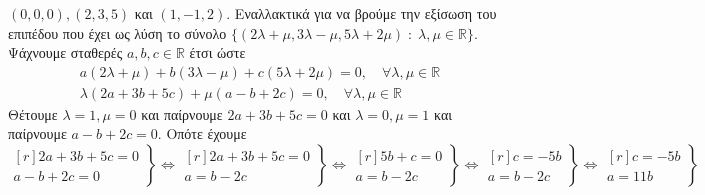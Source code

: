 \begin{examples}
\begin{enumerate}
            $ (0,0,0), (2,3,5) $ και $ (1,-1,2) $. Εναλλακτικά για να βρούμε την 
            εξίσωση του επιπέδου που έχει ως λύση το σύνολο 
            $ \{ (2 \lambda + \mu , 3 \lambda - \mu, 5 \lambda + 2 \mu) \; : \; 
            \lambda, \mu \in \mathbb{R} \} $. Ψάχνουμε σταθερές 
            $ a,b,c \in \mathbb{R} $ έτσι ώστε 
            \begin{align*}
                a(2 \lambda + \mu ) + b(3 \lambda - \mu )+ c (5 \lambda + 2 \mu ) =
                0, \quad \forall \lambda, \mu \in \mathbb{R} \\
                \lambda (2a +3b+5c) + \mu (a-b+2c) = 0, \quad \forall \lambda, \mu 
                \in \mathbb{R}
            \end{align*} 
            Θέτουμε $ \lambda =1, \mu = 0 $ και παίρνουμε $ 2a+3b+5c =0 $ και 
            $ \lambda = 0, \mu =1 $ και παίρνουμε $ a-b+2c=0 $. Οπότε έχουμε
            \[
                \left.
                    \begin{matrix*}[r]
                        2a+3b+5c=0 \\
                        a-b+2c=0
                    \end{matrix*}
                \right\} \Leftrightarrow 
                \left.
                    \begin{matrix*}[r]
                        2a+3b+5c=0 \\
                        a=b-2c
                    \end{matrix*}
                \right\} \Leftrightarrow
                \left.
                    \begin{matrix*}[r]
                        5b+c=0 \\
                        a=b-2c
                    \end{matrix*}
                \right\} \Leftrightarrow
                \left.
                    \begin{matrix*}[r]
                        c=-5b \\
                        a=b-2c
                    \end{matrix*}
                \right\} \Leftrightarrow
                \left.
                    \begin{matrix*}[r]
                        c=-5b \\
                        a=11b
                    \end{matrix*}
                \right\}
            \]


\end{enumerate}
\end{examples}
